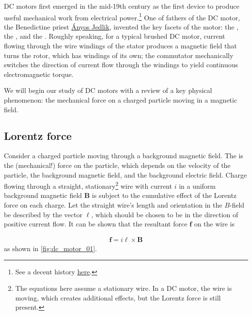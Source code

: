 \documentclass[dynamic_systems.tex]{subfiles}
\begin{document}
DC motors first emerged in the mid-19th century as the first device to produce useful mechanical work from electrical power.\footnote{See a decent history \href{https://en.wikipedia.org/wiki/Electric_motor\#History}{here}.}
One of fathers of the DC motor, the Benedictine priest \href{https://en.wikipedia.org/wiki/\%C3\%81nyos_Jedlik}{\'Anyos Jedlik}, invented the key facets of the motor: the , the , and the . Roughly speaking, for a typical brushed DC motor, current flowing through the wire windings of the stator produces a magnetic field that turns the rotor, which has windings of its own; the commutator mechanically switches the direction of current flow through the windings to yield continuous electromagnetic torque. 

We will begin our study of DC motors with a review of a key physical phenomenon: the mechanical force on a charged particle moving in a magnetic field.
\tags{}

\subsection{Lorentz force}
\tags{}

Consider a charged particle moving through a background magnetic field.
The  is the (mechanical!) force on the particle, which depends on the velocity of the particle, the background magnetic field, and the background electric field.
Charge flowing through a straight, stationary\footnote{The equations here assume a stationary wire. In a DC motor, the wire is moving, which creates additional effects, but the Lorentz force is still present.} wire with current $i$ in a uniform background magnetic field $\bm{B}$ is subject to the cumulative effect of the Lorentz force on each charge.
Let the straight wire's length and orientation in the $B$-field be described by the vector $\bm{\ell}$, which should be chosen to be in the direction of positive current flow.
It can be shown that the resultant force $\bm{f}$ on the wire is

\begin{align}
	\bm{f} = i \bm{\ell} \times \bm{B}
\end{align}
as shown in \cref{fig:dc_motor_01}.
\end{document}

